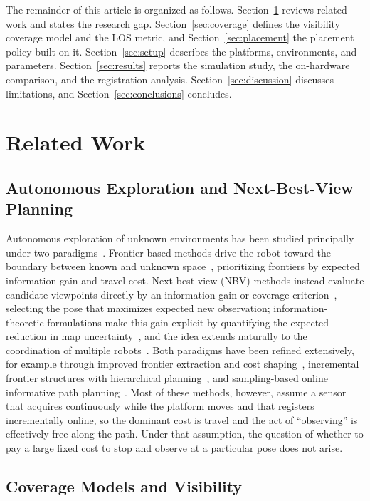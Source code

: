\documentclass[sensors,article,submit,pdftex,moreauthors]{Definitions/mdpi}
\begin{document}
The remainder of this article is organized as follows.
Section~\ref{sec:related} reviews related work and states the research gap.
Section~\ref{sec:coverage} defines the visibility coverage model and the LOS
metric, and Section~\ref{sec:placement} the placement policy built on it.
Section~\ref{sec:setup} describes the platforms, environments, and parameters.
Section~\ref{sec:results} reports the simulation study, the on-hardware
comparison, and the registration analysis. Section~\ref{sec:discussion}
discusses limitations, and Section~\ref{sec:conclusions} concludes.

\section{Related Work}
\label{sec:related}

\subsection{Autonomous Exploration and Next-Best-View Planning}

Autonomous exploration of unknown environments has been studied principally
under two paradigms~\cite{placed2023,lluvia2021}. Frontier-based methods drive
the robot toward the boundary between known and unknown
space~\cite{yamauchi1997,umari2017}, prioritizing frontiers by expected
information gain and travel cost. Next-best-view (NBV) methods instead evaluate
candidate viewpoints directly by an information-gain or coverage
criterion~\cite{connolly1985,bircher2016}, selecting the pose that maximizes
expected new observation; information-theoretic formulations make this gain
explicit by quantifying the expected reduction in map
uncertainty~\cite{stachniss2005}, and the idea extends naturally to the
coordination of multiple robots~\cite{burgard2005}. Both paradigms have been
refined extensively, for example through improved frontier extraction and cost
shaping~\cite{he2025,quin2021}, incremental frontier structures with
hierarchical planning~\cite{zhou2021}, and sampling-based online informative
path planning~\cite{schmid2020}. Most of these methods, however, assume a sensor
that acquires continuously while the platform moves and that registers
incrementally online, so the dominant cost is travel and the act of ``observing''
is effectively free along the path. Under that assumption, the question of
whether to pay a large fixed cost to stop and observe at a particular pose does
not arise.

\subsection{Coverage Models and Visibility}
\end{document}
